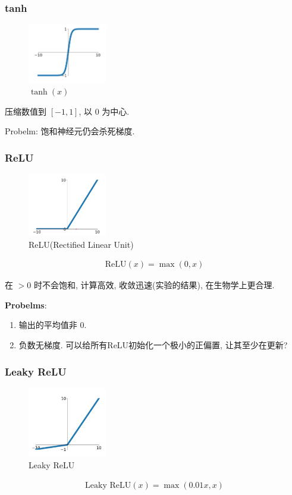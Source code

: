 \subsubsection{tanh}

\begin{figure}[!htb]
    \centering
    \includegraphics[width=0.309\textwidth]{pic/Lec6/tanh.png}
    \caption{$\tanh(x)$}
\end{figure}

压缩数值到 $[-1,1]$, 以 $0$ 为中心. 

Probelm: 饱和神经元仍会杀死梯度. 

\subsubsection{ReLU}
\begin{figure}[!htb]
    \centering
    \includegraphics[width=0.309\textwidth]{pic/Lec6/ReLU.png}
    \caption{ReLU(Rectified Linear Unit)}
\end{figure}
\begin{align*}
    \text{ReLU}(x)=\max(0,x)
\end{align*}

在 $>0$ 时不会饱和, 计算高效, 收敛迅速(实验的结果), 在生物学上更合理. 

\textbf{Probelms}:
\begin{enumerate}
    \item 输出的平均值非 $0$.
    \item 负数无梯度. 可以给所有ReLU初始化一个极小的正偏置, 让其至少在更新?
\end{enumerate}


\subsubsection{Leaky ReLU}
\begin{figure}[!htb]
    \centering
    \includegraphics[width=0.309\textwidth]{pic/Lec6/Leaky ReLU}
    \caption{Leaky ReLU}
\end{figure}
\begin{align*}
    \text{Leaky ReLU}(x)=\max(0.01x, x)
\end{align*}

